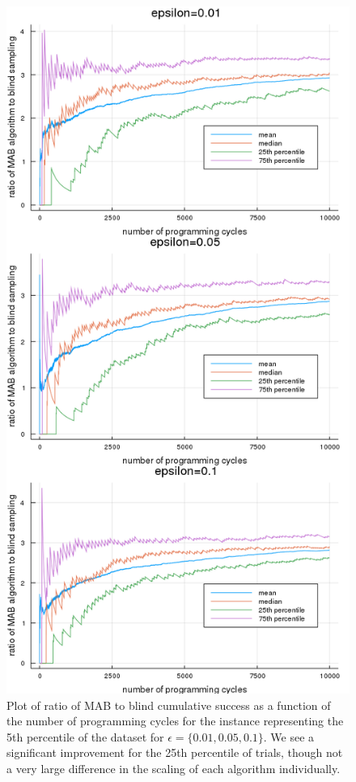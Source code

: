 \begin{figure}
    \includegraphics[width=0.7\columnwidth]{epsilon_inst1_air_eps_comp.png}
    \caption{Plot of ratio of MAB to blind cumulative success as a function of the number of programming cycles for the instance representing the 5th percentile of the dataset for $\epsilon=\{0.01,0.05,0.1\}$. We see a significant improvement for the 25th percentile of trials, though not a very large difference in the scaling of each algorithm individually.}
    \label{fig:epsilon_inst1_air_eps_comp}
\end{figure}

